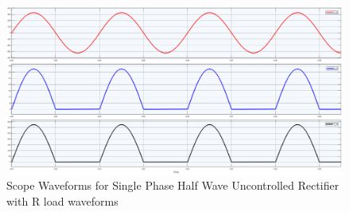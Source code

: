 \begin{figure}[h]
    \centering
    \includegraphics[width=1\textwidth]{images/experiment-1/circuit-scope-simulation-01.png}
    \caption{Scope Waveforms for Single Phase Half Wave Uncontrolled Rectifier with R load waveforms}
    \label{Fig_waveform_single-phase-half-wave-uncontrolled-rectifier-with-R-load}
\end{figure}

\pagebreak
